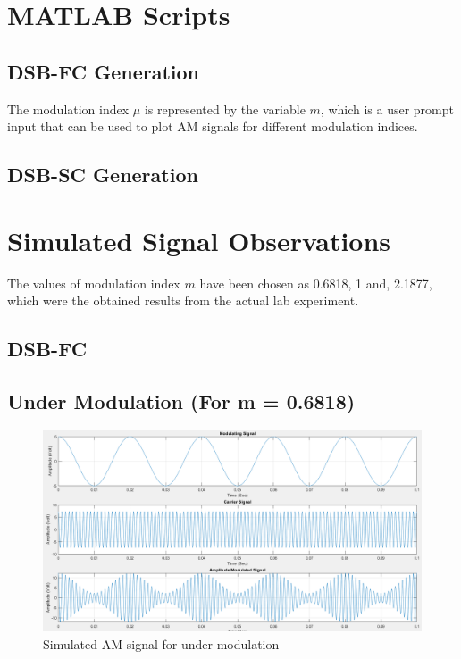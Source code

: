 \documentclass{lab_sheet}
\begin{document}
\section{MATLAB Scripts}
\subsection{DSB-FC Generation}
The modulation index $\mu$ is represented by the variable $m$, which is a user prompt input that can be used to plot AM signals for different modulation indices.

\subsection{DSB-SC Generation}

\section{Simulated Signal Observations}
The values of modulation index $m$ have been chosen as 0.6818, 1 and, 2.1877, which were the obtained results from the actual lab experiment. 
\subsection{DSB-FC}
\subsection*{Under Modulation (For m = 0.6818)}
\begin{figure}[H]
 \centering
        \includegraphics[width=.9\linewidth]{Figures/sim_dsb_fc_under.png}
    \caption{Simulated AM signal for under modulation}
  \end{figure}
\end{document}
